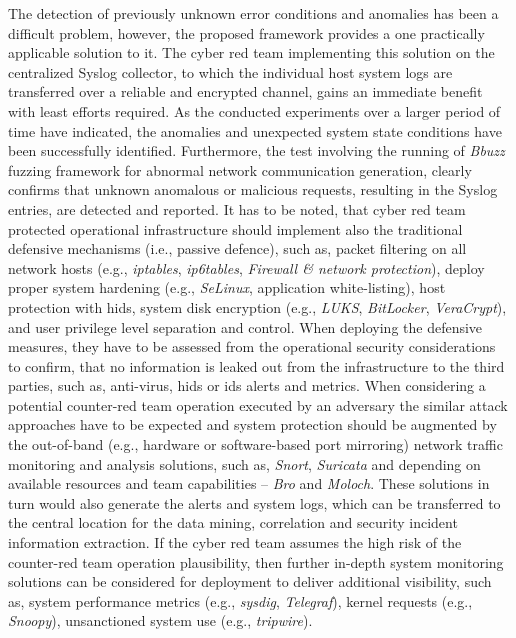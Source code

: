 The detection of previously unknown error conditions and anomalies has been a difficult problem, however, the proposed framework provides a one practically applicable solution to it. The cyber red team implementing this solution on the centralized Syslog collector, to which the individual host system logs are transferred over a reliable and encrypted channel, gains an immediate benefit with least efforts required.
As the conducted experiments over a larger period of time have indicated, the anomalies and unexpected system state conditions have been successfully identified. Furthermore, the test involving the running of \textit{Bbuzz} fuzzing framework for abnormal network communication generation, clearly confirms that unknown anomalous or malicious requests, resulting in the Syslog entries, are detected and reported.
It has to be noted, that cyber red team protected operational infrastructure should implement also the traditional defensive mechanisms (i.e., passive defence), such as, packet filtering on all network hosts (e.g., \textit{iptables}, \textit{ip6tables}, \textit{Firewall \& network protection}), deploy proper system hardening (e.g., \textit{SeLinux}, application white-listing), host protection with \gls{hids}, system disk encryption (e.g., \textit{LUKS}, \textit{BitLocker}, \textit{VeraCrypt}), and user privilege level separation and control. When deploying the defensive measures, they have to be assessed from the operational security considerations to confirm, that no information is leaked out from the infrastructure to the third parties, such as, anti-virus, \gls{hids} or \gls{ids} alerts and metrics.
When considering a potential counter-red team operation executed by an adversary the similar attack approaches have to be expected and system protection should be augmented by the out-of-band (e.g., hardware or software-based port mirroring) network traffic monitoring and analysis solutions, such as, \textit{Snort}, \textit{Suricata} and depending on available resources and team capabilities -- \textit{Bro} and \textit{Moloch}. These solutions in turn would also generate the alerts and system logs, which can be transferred to the central location for the data mining, correlation and security incident information extraction.
If the cyber red team assumes the high risk of the counter-red team operation plausibility, then further in-depth system monitoring solutions can be considered for deployment to deliver additional visibility, such as, system performance metrics (e.g., \textit{sysdig}, \textit{Telegraf}), kernel requests (e.g., \textit{Snoopy}), unsanctioned system use (e.g., \textit{tripwire}).


